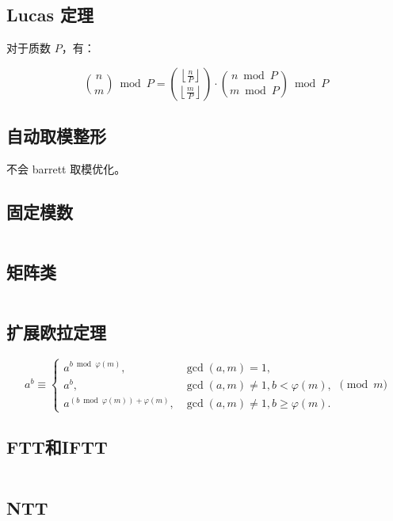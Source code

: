 \inputminted[mathescape]{cpp}{icpc/math/gcd/fast_gcd.cpp}

\subsection{Lucas 定理}

对于质数 $P$，有：

\[
\binom{n}{m}\bmod P =
\binom{\left\lfloor\frac{n}{P}\right\rfloor}{\left\lfloor\frac{m}{P}\right\rfloor}
\cdot \binom{n\bmod P}{m\bmod P}\bmod P
\]

\subsection{自动取模整形}

不会 barrett 取模优化。

\subsection{固定模数}

\inputminted{cpp}{icpc/math/modint/static_modint.cpp}

\subsection{矩阵类}

\inputminted{cpp}{icpc/math/matrix/matrix.cpp}

\subsection{扩展欧拉定理}

\[
    a^b \equiv \begin{cases}
        a^{b \bmod \varphi\left(m\right)},                &\gcd\left(a,m\right) =  1,                   \\
        a^b,                                   &\gcd\left(a,m\right)\ne 1, b <   \varphi\left(m\right), \\
        a^{\left(b \bmod \varphi\left(m\right)\right) + \varphi\left(m\right)}, &\gcd\left(a,m\right)\ne 1, b \ge \varphi\left(m\right).
      \end{cases} \pmod m
\]

\subsection{FTT和IFTT}

\inputminted{cpp}{icpc/math/FTT/FTT.cpp}

\subsection{NTT}

\inputminted{cpp}{icpc/math/NTT/NTT.cpp}